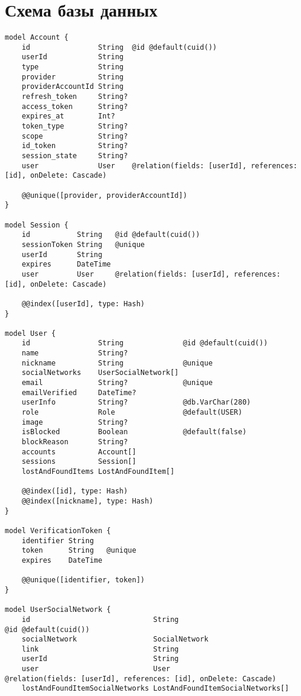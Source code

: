 \documentclass{mirea}
\begin{document}
\appendix

\section{Схема базы данных}

\begin{lstlisting}[label=lst:factorial]
model Account {
	id                String  @id @default(cuid())
	userId            String
	type              String
	provider          String
	providerAccountId String
	refresh_token     String?
	access_token      String?
	expires_at        Int?
	token_type        String?
	scope             String?
	id_token          String?
	session_state     String?
	user              User    @relation(fields: [userId], references: [id], onDelete: Cascade)
	
	@@unique([provider, providerAccountId])
}

model Session {
	id           String   @id @default(cuid())
	sessionToken String   @unique
	userId       String
	expires      DateTime
	user         User     @relation(fields: [userId], references: [id], onDelete: Cascade)
	
	@@index([userId], type: Hash)
}

model User {
	id                String              @id @default(cuid())
	name              String?
	nickname          String              @unique
	socialNetworks    UserSocialNetwork[]
	email             String?             @unique
	emailVerified     DateTime?
	userInfo          String?             @db.VarChar(280)
	role              Role                @default(USER)
	image             String?
	isBlocked         Boolean             @default(false)
	blockReason       String?
	accounts          Account[]
	sessions          Session[]
	lostAndFoundItems LostAndFoundItem[]
	
	@@index([id], type: Hash)
	@@index([nickname], type: Hash)
}

model VerificationToken {
	identifier String
	token      String   @unique
	expires    DateTime
	
	@@unique([identifier, token])
}

model UserSocialNetwork {
	id                             String                           @id @default(cuid())
	socialNetwork                  SocialNetwork
	link                           String
	userId                         String
	user                           User                             @relation(fields: [userId], references: [id], onDelete: Cascade)
	lostAndFoundItemSocialNetworks LostAndFoundItemSocialNetworks[]
	

\end{lstlisting}
\end{document}
